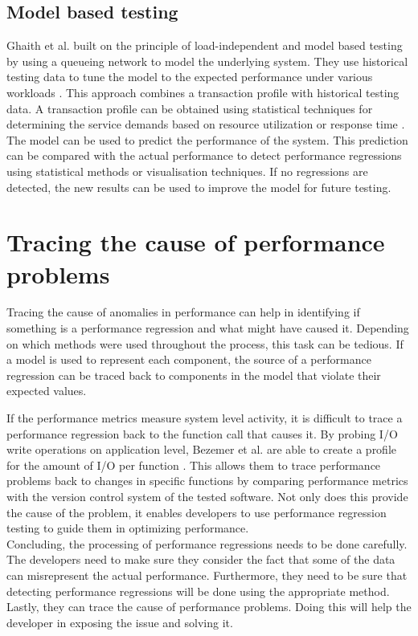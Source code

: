 \subsection{Model based testing}
Ghaith et al. built on the principle of load-independent and model based testing by using a queueing network to model the underlying system. They use historical testing data to tune the model to the expected performance under various workloads \cite{ghaith2013profile}. This approach combines a transaction profile with historical testing data. A transaction profile can be obtained using statistical techniques for determining the service demands based on resource utilization \cite{casale2008robust} or response time \cite{kraft2009estimating}. The model can be used to predict the performance of the system. This prediction can be compared with the actual performance to detect performance regressions using statistical methods or visualisation techniques.
If no regressions are detected, the new results can be used to improve the model for future testing.

\section{Tracing the cause of performance problems}
Tracing the cause of anomalies in performance can help in identifying if something is a performance regression and what might have caused it. Depending on which methods were used throughout the process, this task can be tedious. If a model is used to represent each component, the source of a performance regression can be traced back to components in the model that violate their expected values.

If the performance metrics measure system level activity, it is difficult to trace a performance regression back to the function call that causes it. By probing I/O write operations on application level, Bezemer et al. are able to create a profile for the amount of I/O per function \cite{bezemer2014detecting}. This allows them to trace performance problems back to changes in specific functions by comparing performance metrics with the version control system of the tested software. Not only does this provide the cause of the problem, it enables developers to use performance regression testing to guide them in optimizing performance. \\

Concluding, the processing of performance regressions needs to be done carefully. The developers need to make sure they consider the fact that some of the data can misrepresent the actual performance. Furthermore, they need to be sure that detecting performance regressions will be done using the appropriate method. Lastly, they can trace the cause of performance problems. Doing this will help the developer in exposing the issue and solving it.

